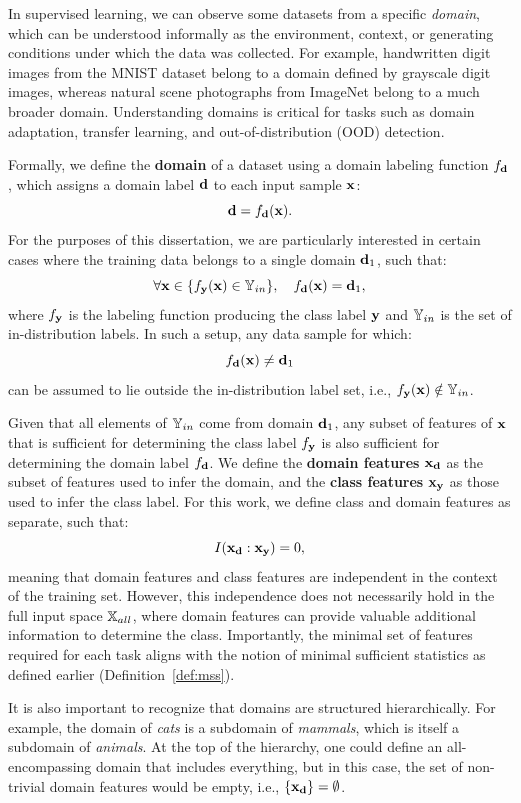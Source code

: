 \documentclass[11pt, oneside]{book}
\theoremstyle{plain}
\theoremstyle{definition}
\theoremstyle{remark}
\begin{document}
In supervised learning, we can observe some datasets from a specific \textit{domain}, which can be understood informally as the environment, context, or generating conditions under which the data was collected. For example, handwritten digit images from the MNIST dataset belong to a domain defined by grayscale digit images, whereas natural scene photographs from ImageNet belong to a much broader domain. Understanding domains is critical for tasks such as domain adaptation, transfer learning, and out-of-distribution (OOD) detection.

Formally, we define the \textbf{domain} of a dataset using a domain labeling function \( f_{{\mathbf{d}}} \), which assigns a domain label \( {\mathbf{d}} \) to each input sample \( {\mathbf{x}} \):
\[
{\mathbf{d}} = f_{{\mathbf{d}}}({\mathbf{x}}).
\]
For the purposes of this dissertation, we are particularly interested in certain cases where the training data belongs to a single domain \( {\mathbf{d}}_1 \), such that:
\[
\forall {\mathbf{x}} \in \{ f_{{\mathbf{y}}}({\mathbf{x}}) \in {\mathbb{Y}}_{in} \}, \quad f_{{\mathbf{d}}}({\mathbf{x}}) = {\mathbf{d}}_1,
\]
where \( f_{{\mathbf{y}}} \) is the labeling function producing the class label \( {\mathbf{y}} \) and \( {\mathbb{Y}}_{in} \) is the set of in-distribution labels. In such a setup, any data sample for which:
\[
f_{{\mathbf{d}}}({\mathbf{x}}) \neq {\mathbf{d}}_1
\]
can be assumed to lie outside the in-distribution label set, i.e., \( f_{{\mathbf{y}}}({\mathbf{x}}) \notin {\mathbb{Y}}_{in} \).

Given that all elements of \( {\mathbb{Y}}_{in} \) come from domain \( {\mathbf{d}}_1 \), any subset of features of \( {\mathbf{x}} \) that is sufficient for determining the class label \( f_{{\mathbf{y}}} \) is also sufficient for determining the domain label \( f_{{\mathbf{d}}} \). We define the \textbf{domain features} \( {\mathbf{x}}_{{\mathbf{d}}} \) as the subset of features used to infer the domain, and the \textbf{class features} \( {\mathbf{x}}_{{\mathbf{y}}} \) as those used to infer the class label. For this work, we define class and domain features as separate, such that:
\[
I({\mathbf{x}}_{{\mathbf{d}}} : {\mathbf{x}}_{{\mathbf{y}}}) = 0,
\]
meaning that domain features and class features are independent in the context of the training set. However, this independence does not necessarily hold in the full input space \( {\mathbb{X}}_{all} \), where domain features can provide valuable additional information to determine the class. Importantly, the minimal set of features required for each task aligns with the notion of minimal sufficient statistics as defined earlier (Definition~\ref{def:mss}).

It is also important to recognize that domains are structured hierarchically. For example, the domain of \textit{cats} is a subdomain of \textit{mammals}, which is itself a subdomain of \textit{animals}. At the top of the hierarchy, one could define an all-encompassing domain that includes everything, but in this case, the set of non-trivial domain features would be empty, i.e., \( \{{\mathbf{x}}_{{\mathbf{d}}}\} = \emptyset \).
\end{document}
